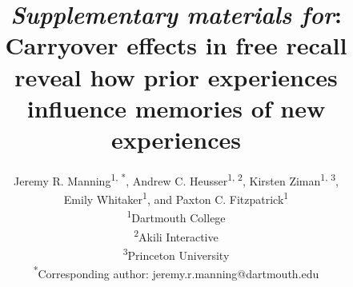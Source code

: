 \documentclass{article}
\title{\textit{Supplementary materials for}: Carryover effects in free recall reveal how prior experiences influence memories of new experiences}
\author{Jeremy R. Manning\textsuperscript{1, *}, Andrew C. Heusser\textsuperscript{1, 2}, Kirsten Ziman\textsuperscript{1, 3},\\Emily Whitaker\textsuperscript{1}, and Paxton C. Fitzpatrick\textsuperscript{1}\\\textsuperscript{1}Dartmouth College\\\textsuperscript{2}Akili Interactive\\\textsuperscript{3}Princeton University\\\textsuperscript{*}Corresponding author: jeremy.r.manning@dartmouth.edu}
\date{}
\newcommand{\demo}{1}
\begin{document}
\renewcommand{\figurename}{Supplementary Figure}


\setcounter{equation}{0}
\setcounter{figure}{0}
\setcounter{table}{0}
\setcounter{page}{1}
\setcounter{section}{0}
\makeatletter
\renewcommand{\theequation}{S\arabic{equation}}
\renewcommand{\thefigure}{S\arabic{figure}}
\renewcommand{\bibnumfmt}[1]{[S#1]}
\renewcommand{\citenumfont}[1]{S#1}

\newcommand{\demo}{1}

\maketitle

\newpage
\renewcommand{\refname}{Supplementary references}


\end{document}
